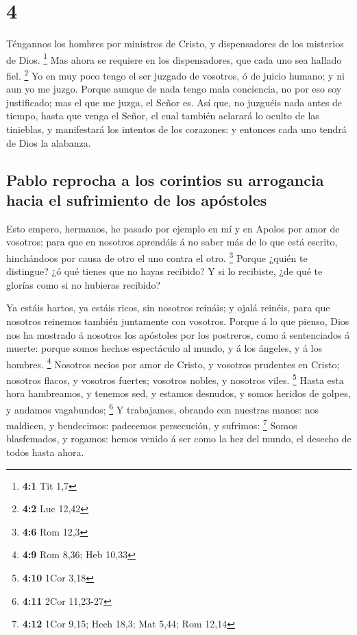 \hypertarget{section-3}{%
\section{4}\label{section-3}}

 Téngannos los hombres por ministros de Cristo, y
dispensadores de los misterios de Dios. \footnote{\textbf{4:1} Tit 1,7}
 Mas ahora se requiere en los dispensadores, que cada uno
sea hallado fiel. \footnote{\textbf{4:2} Luc 12,42}  Yo en
muy poco tengo el ser juzgado de vosotros, ó de juicio humano; y ni aun
yo me juzgo.  Porque aunque de nada tengo mala conciencia,
no por eso soy justificado; mas el que me juzga, el Señor es.
 Así que, no juzguéis nada antes de tiempo, hasta que
venga el Señor, el cual también aclarará lo oculto de las tinieblas, y
manifestará los intentos de los corazones: y entonces cada uno tendrá de
Dios la alabanza.

\hypertarget{pablo-reprocha-a-los-corintios-su-arrogancia-hacia-el-sufrimiento-de-los-apuxf3stoles}{%
\subsection{Pablo reprocha a los corintios su arrogancia hacia el
sufrimiento de los
apóstoles}\label{pablo-reprocha-a-los-corintios-su-arrogancia-hacia-el-sufrimiento-de-los-apuxf3stoles}}

 Esto empero, hermanos, he pasado por ejemplo en mí y en
Apolos por amor de vosotros; para que en nosotros aprendáis á no saber
más de lo que está escrito, hinchándoos por causa de otro el uno contra
el otro. \footnote{\textbf{4:6} Rom 12,3}  Porque ¿quién
te distingue? ¿ó qué tienes que no hayas recibido? Y si lo recibiste,
¿de qué te glorías como si no hubieras recibido?

 Ya estáis hartos, ya estáis ricos, sin nosotros reináis;
y ojalá reinéis, para que nosotros reinemos también juntamente con
vosotros.  Porque á lo que pienso, Dios nos ha mostrado á
nosotros los apóstoles por los postreros, como á sentenciados á muerte:
porque somos hechos espectáculo al mundo, y á los ángeles, y á los
hombres. \footnote{\textbf{4:9} Rom 8,36; Heb 10,33} 
Nosotros necios por amor de Cristo, y vosotros prudentes en Cristo;
nosotros flacos, y vosotros fuertes; vosotros nobles, y nosotros viles.
\footnote{\textbf{4:10} 1Cor 3,18}  Hasta esta hora
hambreamos, y tenemos sed, y estamos desnudos, y somos heridos de
golpes, y andamos vagabundos; \footnote{\textbf{4:11} 2Cor 11,23-27}
 Y trabajamos, obrando con nuestras manos: nos maldicen,
y bendecimos: padecemos persecución, y sufrimos: \footnote{\textbf{4:12}
  1Cor 9,15; Hech 18,3; Mat 5,44; Rom 12,14}  Somos
blasfemados, y rogamos: hemos venido á ser como la hez del mundo, el
desecho de todos hasta ahora.

